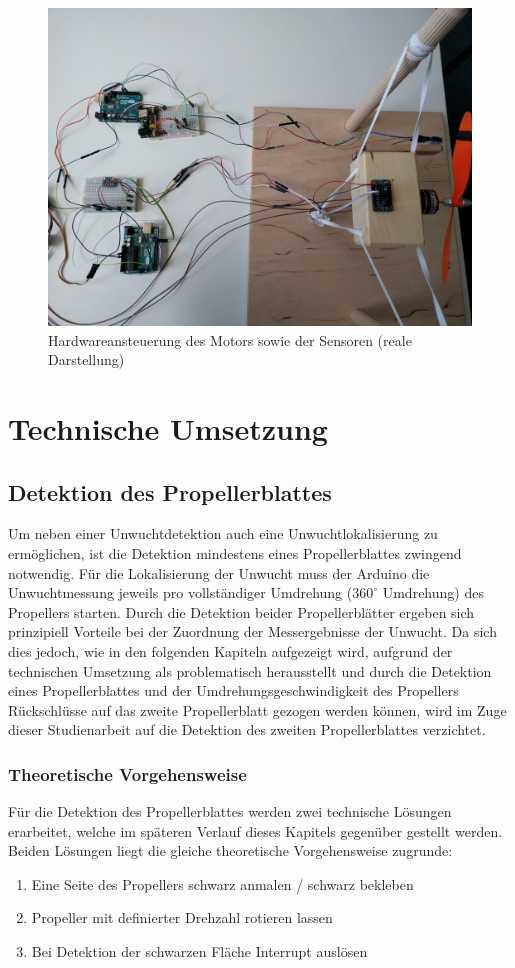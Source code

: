 \begin{figure}[H]
	\centering
	\includegraphics[width=.9\textwidth]{images/chapter/03/exp_arduino_sensors.jpg}
	\caption{Hardwareansteuerung des Motors sowie der Sensoren (reale Darstellung)}
	\label{fig:hardwaremodel_real}
\end{figure}
\section{Technische Umsetzung}

\subsection{Detektion des Propellerblattes}
\label{sec:detect_propeller}
Um neben einer Unwuchtdetektion auch eine Unwuchtlokalisierung zu ermöglichen, ist die Detektion mindestens eines Propellerblattes zwingend notwendig.
Für die Lokalisierung der Unwucht muss der Arduino die Unwuchtmessung jeweils pro vollständiger Umdrehung ($360^\circ$ Umdrehung) des Propellers starten.
Durch die Detektion beider Propellerblätter ergeben sich prinzipiell Vorteile bei der Zuordnung der Messergebnisse der Unwucht. 
Da sich dies jedoch, wie in den folgenden Kapiteln aufgezeigt wird, aufgrund der technischen Umsetzung als problematisch herausstellt und durch die Detektion eines Propellerblattes und der Umdrehungsgeschwindigkeit des Propellers Rückschlüsse auf das zweite Propellerblatt gezogen werden können, wird im Zuge dieser Studienarbeit auf die Detektion des zweiten Propellerblattes verzichtet.

\subsubsection*{Theoretische Vorgehensweise}
Für die Detektion des Propellerblattes werden zwei technische Lösungen erarbeitet, welche im späteren Verlauf dieses Kapitels gegenüber gestellt werden.
Beiden Lösungen liegt die gleiche theoretische Vorgehensweise zugrunde:
\begin{enumerate}
	\item Eine Seite des Propellers schwarz anmalen / schwarz bekleben
	\item Propeller mit definierter Drehzahl rotieren lassen
	\item Bei Detektion der schwarzen Fläche Interrupt auslösen
\end{enumerate}


